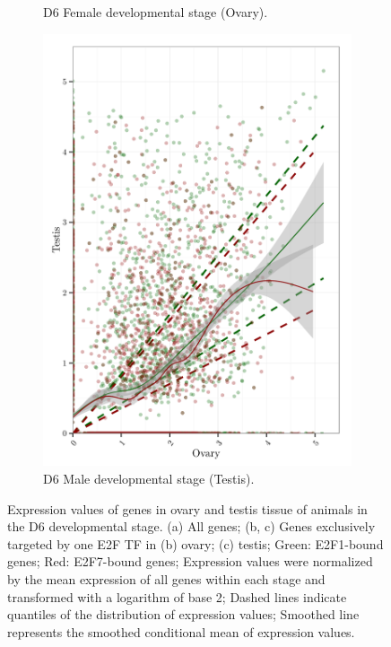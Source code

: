 \documentclass[11pt,twoside,a4paper]{report}
\begin{document}
\begin{figure}[h!]
\begin{subfigure}{0.5\textwidth}
				\caption{D6 Female developmental stage (Ovary).}
			\end{subfigure}%
			\begin{subfigure}{.5\textwidth}
				\centering
				\includegraphics[width=1\linewidth]{pngs/E2F_specific_Male_expression.png}
				\caption{D6 Male developmental stage (Testis).}
			\end{subfigure}
			\caption[Expression values of all genes and genes exclusively targeted by one E2F TF in ovary and testis tissue]
			{Expression values of genes in ovary and testis tissue of animals in the D6 developmental stage.
			(a) All genes;
			(b, c) Genes exclusively targeted by one E2F TF in (b) ovary; (c) testis;			
			Green: E2F1-bound genes;
			Red: E2F7-bound genes;
				{\footnotesize
				Expression values were normalized by the mean expression of all genes within each stage and transformed with a logarithm of base 2;
				Dashed lines indicate quantiles of the distribution of expression values;
				Smoothed line represents the smoothed conditional mean of expression values.
				}
			}
			\label{fig:E2F_targets_expression}
		\end{figure}
		
\end{document}
